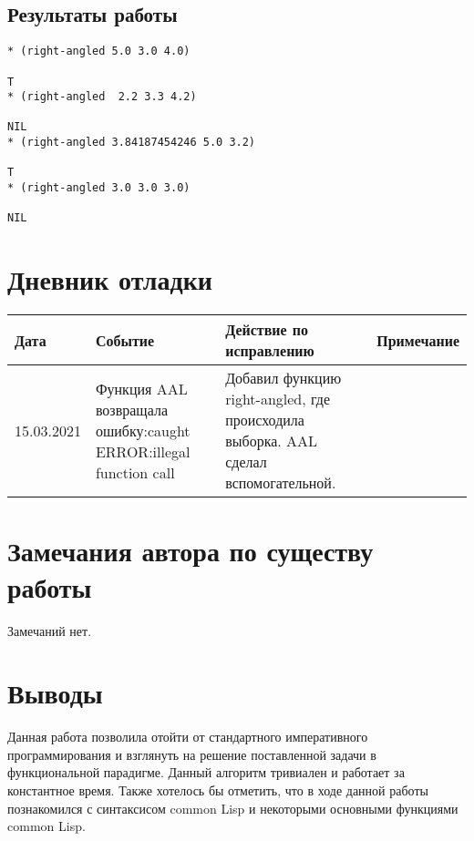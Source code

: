 \documentclass[12pt]{article}
\begin{document}
\subsection{Результаты работы}
\begin{verbatim}
* (right-angled 5.0 3.0 4.0)

T
* (right-angled  2.2 3.3 4.2)

NIL
* (right-angled 3.84187454246 5.0 3.2)

T
* (right-angled 3.0 3.0 3.0)

NIL
\end{verbatim}
%

\section{Дневник отладки}
\begin{tabular}{|p{50pt}|p{130pt}|p{130pt}|p{70pt}|}
\hline
Дата & Событие & Действие по исправлению & Примечание \\ \hline
15.03.2021 & Функция AAL возвращала ошибку:caught ERROR:illegal function call & Добавил функцию right-angled, где происходила выборка. AAL сделал вспомогательной.  &\\
\hline
\end{tabular}

\section{Замечания автора по существу работы}
Замечаний нет.

\section{Выводы}
Данная работа позволила отойти от стандартного императивного программирования и взглянуть на решение поставленной задачи  в функциональной парадигме. Данный алгоритм тривиален и работает за константное время. Также хотелось бы отметить, что в ходе данной работы познакомился с синтаксисом common Lisp и некоторыми основными функциями common Lisp.
\end{document}
